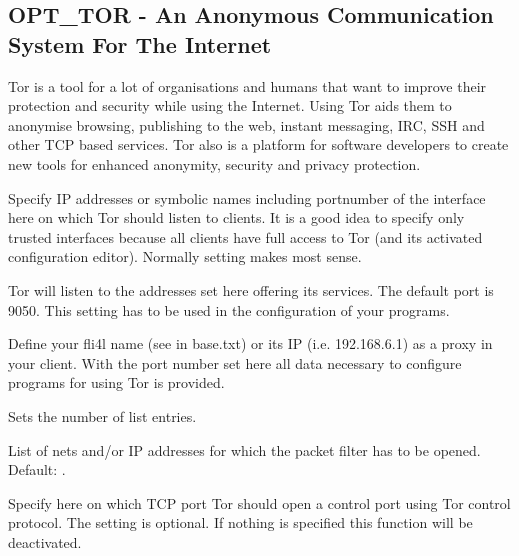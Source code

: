 \subsection{OPT\_TOR - An Anonymous Communication System For The Internet}

Tor is a tool for a lot of organisations and humans that want to improve
their protection and security while using the Internet. Using Tor aids
them to anonymise browsing, publishing to the web, instant messaging,
IRC, SSH and other TCP based services. Tor also is a platform for software
developers to create new tools for enhanced anonymity, security and
privacy protection.


\begin{description}



        {Specify IP addresses or symbolic names including portnumber of
        the interface here on which Tor should listen to clients.
        It is a good idea to specify only trusted interfaces because
        all clients have full access to Tor (and its activated
        configuration editor). Normally setting 
        makes most sense.

        Tor will listen to the addresses set here offering its
        services. The default port is 9050. This setting has to be used
        in the configuration of your programs.

        Define your fli4l name (see  in base.txt) or its
        IP (i.e. 192.168.6.1) as a proxy in your client. With the port
        number set here all data necessary to configure programs
        for using Tor is provided.}


        {Sets the number of list entries.}


        List of nets and/or IP addresses for which the packet filter
        has to be opened. Default: .


        Specify here on which TCP port Tor should open a control
        port using Tor control protocol. The setting is optional.
        If nothing is specified this function will be deactivated.


\end{description}
